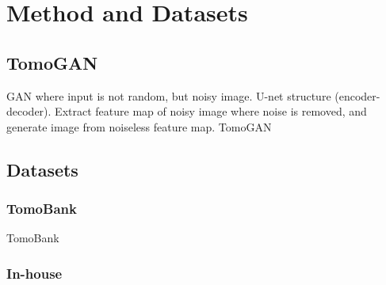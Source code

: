 \chapter{Method and Datasets}
\label{sec:method}

\section{TomoGAN}
GAN where input is not random, but noisy image. U-net structure (encoder-decoder). Extract feature map of noisy image where noise is removed, and generate image from noiseless feature map. 
TomoGAN \cite{liu2020tomogan}

\section{Datasets}
\subsection{TomoBank}
TomoBank \cite{TomoBank}

\subsection{In-house}